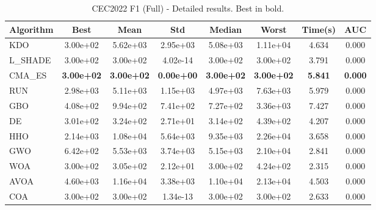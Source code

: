 \begin{table}[H]
\centering\small
\caption{CEC2022 F1 (Full) - Detailed results. Best in bold.}
\label{tab:cec2022_F1}
\begin{tabular}{lccccccc}
\toprule
\textbf{Algorithm} & \textbf{Best} & \textbf{Mean} & \textbf{Std} & \textbf{Median} & \textbf{Worst} & \textbf{Time(s)} & \textbf{AUC} \\
\midrule
KDO & 3.00e+02 & 5.62e+03 & 2.95e+03 & 5.08e+03 & 1.11e+04 & 4.634 & 0.000 \\
L_SHADE & 3.00e+02 & 3.00e+02 & 4.02e-14 & 3.00e+02 & 3.00e+02 & 3.791 & 0.000 \\
CMA_ES & \textbf{3.00e+02} & \textbf{3.00e+02} & \textbf{0.00e+00} & \textbf{3.00e+02} & \textbf{3.00e+02} & \textbf{5.841} & \textbf{0.000} \\
RUN & 2.98e+03 & 5.11e+03 & 1.15e+03 & 4.97e+03 & 7.63e+03 & 5.979 & 0.000 \\
GBO & 4.08e+02 & 9.94e+02 & 7.41e+02 & 7.27e+02 & 3.36e+03 & 7.427 & 0.000 \\
DE & 3.01e+02 & 3.24e+02 & 2.71e+01 & 3.14e+02 & 4.39e+02 & 4.207 & 0.000 \\
HHO & 2.14e+03 & 1.08e+04 & 5.64e+03 & 9.35e+03 & 2.26e+04 & 3.658 & 0.000 \\
GWO & 6.42e+02 & 5.53e+03 & 3.74e+03 & 5.15e+03 & 2.10e+04 & 2.841 & 0.000 \\
WOA & 3.00e+02 & 3.05e+02 & 2.12e+01 & 3.00e+02 & 4.24e+02 & 2.315 & 0.000 \\
AVOA & 4.60e+03 & 1.16e+04 & 3.38e+03 & 1.10e+04 & 2.13e+04 & 4.503 & 0.000 \\
COA & 3.00e+02 & 3.00e+02 & 1.34e-13 & 3.00e+02 & 3.00e+02 & 2.633 & 0.000 \\
\bottomrule
\end{tabular}
\end{table}

